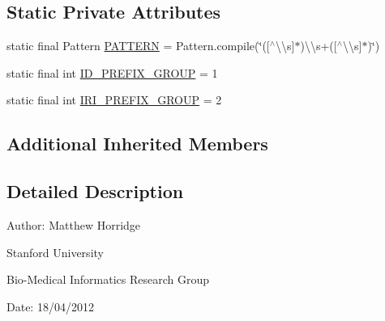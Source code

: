 \subsection*{Static Private Attributes}
\begin{DoxyCompactItemize}
\item 
static final Pattern \hyperlink{classorg_1_1coode_1_1owlapi_1_1obo_1_1parser_1_1_i_d_space_tag_value_handler_a8d1c8ac6f7a614d193e470f0c07648d3}{P\-A\-T\-T\-E\-R\-N} = Pattern.\-compile(\char`\"{}(\mbox{[}$^\wedge$\textbackslash{}\textbackslash{}s\mbox{]}$\ast$)\textbackslash{}\textbackslash{}s+(\mbox{[}$^\wedge$\textbackslash{}\textbackslash{}s\mbox{]}$\ast$)\char`\"{})
\item 
static final int \hyperlink{classorg_1_1coode_1_1owlapi_1_1obo_1_1parser_1_1_i_d_space_tag_value_handler_a4ec815b017ea8d054aed4b0fb967f63a}{I\-D\-\_\-\-P\-R\-E\-F\-I\-X\-\_\-\-G\-R\-O\-U\-P} = 1
\item 
static final int \hyperlink{classorg_1_1coode_1_1owlapi_1_1obo_1_1parser_1_1_i_d_space_tag_value_handler_a616ed97da5b188540789b7aeec8830c7}{I\-R\-I\-\_\-\-P\-R\-E\-F\-I\-X\-\_\-\-G\-R\-O\-U\-P} = 2
\end{DoxyCompactItemize}
\subsection*{Additional Inherited Members}


\subsection{Detailed Description}
Author\-: Matthew Horridge\par
 Stanford University\par
 Bio-\/\-Medical Informatics Research Group\par
 Date\-: 18/04/2012 

